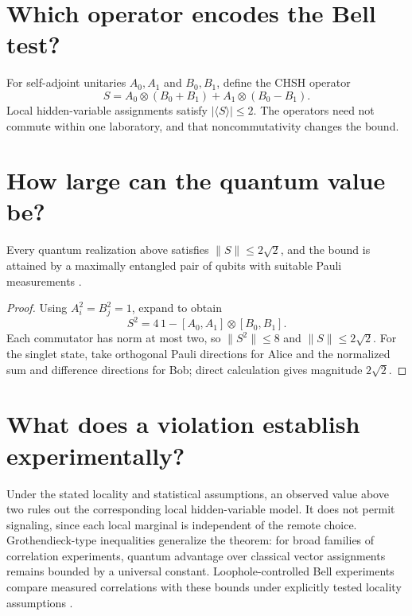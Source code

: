 
\section{Which operator encodes the Bell test?}

For self-adjoint unitaries $A_0,A_1$ and $B_0,B_1$, define the CHSH operator
\[
S=A_0\otimes(B_0+B_1)+A_1\otimes(B_0-B_1).
\]
Local hidden-variable assignments satisfy $|\langle S\rangle|\leq2$.  The
operators need not commute within one laboratory, and that noncommutativity
changes the bound.

\section{How large can the quantum value be?}

\begin{theorem}
Every quantum realization above satisfies
$\|S\|\leq2\sqrt2$, and the bound is attained by a maximally entangled pair
of qubits with suitable Pauli measurements \cite{tsirelson}.
\end{theorem}

\begin{proof}
Using $A_i^2=B_j^2=1$, expand to obtain
\[
S^2=4\,1-[A_0,A_1]\otimes[B_0,B_1].
\]
Each commutator has norm at most two, so $\|S^2\|\leq8$ and
$\|S\|\leq2\sqrt2$.  For the singlet state, take orthogonal Pauli directions
for Alice and the normalized sum and difference directions for Bob; direct
calculation gives magnitude $2\sqrt2$.
\end{proof}

\section{What does a violation establish experimentally?}

Under the stated locality and statistical assumptions, an observed value
above two rules out the corresponding local hidden-variable model.  It does
not permit signaling, since each local marginal is independent of the remote
choice.  Grothendieck-type inequalities generalize the theorem: for broad
families of correlation experiments, quantum advantage over classical vector
assignments remains bounded by a universal constant.  Loophole-controlled
Bell experiments compare measured correlations with these bounds under
explicitly tested locality assumptions \cite{hensen}.

